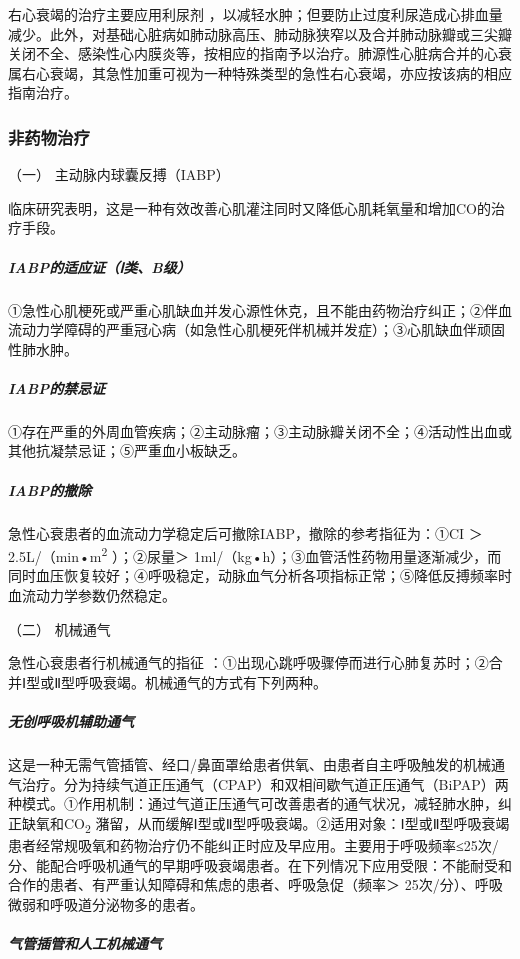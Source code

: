 右心衰竭的治疗主要应用利尿剂
，以减轻水肿；但要防止过度利尿造成心排血量减少。此外，对基础心脏病如肺动脉高压、肺动脉狭窄以及合并肺动脉瓣或三尖瓣关闭不全、感染性心内膜炎等，按相应的指南予以治疗。肺源性心脏病合并的心衰属右心衰竭，其急性加重可视为一种特殊类型的急性右心衰竭，亦应按该病的相应指南治疗。

\subsubsection{非药物治疗}

\hypertarget{text00071.htmlux5cux23CHP3-2-5-5-6-1}{}
（一） 主动脉内球囊反搏（IABP）

临床研究表明，这是一种有效改善心肌灌注同时又降低心肌耗氧量和增加CO的治疗手段。

\subparagraph{IABP的适应证（Ⅰ类、B级）}

①急性心肌梗死或严重心肌缺血并发心源性休克，且不能由药物治疗纠正；②伴血流动力学障碍的严重冠心病（如急性心肌梗死伴机械并发症）；③心肌缺血伴顽固性肺水肿。

\subparagraph{IABP的禁忌证}

①存在严重的外周血管疾病；②主动脉瘤；③主动脉瓣关闭不全；④活动性出血或其他抗凝禁忌证；⑤严重血小板缺乏。

\subparagraph{IABP的撤除}

急性心衰患者的血流动力学稳定后可撤除IABP，撤除的参考指征为：①CI ＞
2.5L/（min•m\textsuperscript{2} ）；②尿量＞
1ml/（kg•h）；③血管活性药物用量逐渐减少，而同时血压恢复较好；④呼吸稳定，动脉血气分析各项指标正常；⑤降低反搏频率时血流动力学参数仍然稳定。

\hypertarget{text00071.htmlux5cux23CHP3-2-5-5-6-2}{}
（二） 机械通气

急性心衰患者行机械通气的指征
：①出现心跳呼吸骤停而进行心肺复苏时；②合并Ⅰ型或Ⅱ型呼吸衰竭。机械通气的方式有下列两种。

\subparagraph{无创呼吸机辅助通气}

这是一种无需气管插管、经口/鼻面罩给患者供氧、由患者自主呼吸触发的机械通气治疗。分为持续气道正压通气（CPAP）和双相间歇气道正压通气（BiPAP）两种模式。①作用机制：通过气道正压通气可改善患者的通气状况，减轻肺水肿，纠正缺氧和CO\textsubscript{2}
潴留，从而缓解Ⅰ型或Ⅱ型呼吸衰竭。②适用对象：Ⅰ型或Ⅱ型呼吸衰竭患者经常规吸氧和药物治疗仍不能纠正时应及早应用。主要用于呼吸频率≤25次/分、能配合呼吸机通气的早期呼吸衰竭患者。在下列情况下应用受限：不能耐受和合作的患者、有严重认知障碍和焦虑的患者、呼吸急促（频率＞
25次/分）、呼吸微弱和呼吸道分泌物多的患者。

\subparagraph{气管插管和人工机械通气}

